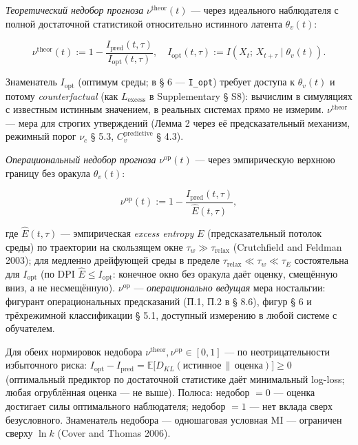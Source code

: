 \documentclass[pdflatex,sn-mathphys-ay]{sn-jnl}
\begin{document}
\emph{Теоретический недобор прогноза} \(\nu^{\text{theor}}(t)\) --- через идеального наблюдателя с полной достаточной статистикой относительно истинного латента \(\theta_v(t)\):



\begin{equation}\nu^{\text{theor}}(t) := 1 - \frac{I_{\text{pred}}(t, \tau)}{I_{\text{opt}}(t, \tau)}, \quad I_{\text{opt}}(t,\tau) := I\!\left(X_t;\, X_{t+\tau} \mid \theta_v(t)\right). \tag{7}\end{equation}



Знаменатель \(I_{\text{opt}}\) (оптимум среды; в § 6 --- \texttt{I\_opt}) требует доступа к \(\theta_v(t)\) и потому \emph{counterfactual} (как \(L_{\text{excess}}\) в Supplementary § S8): вычислим в симуляциях с известным истинным значением, в реальных системах прямо не измерим. \(\nu^{\text{theor}}\) --- мера для строгих утверждений (Лемма 2 через её предсказательный механизм, режимный порог \(\nu_c\) § 5.3, \(C_v^{\text{predictive}}\) § 4.3).



\emph{Операциональный недобор прогноза} \(\nu^{\text{op}}(t)\) --- через эмпирическую верхнюю границу без оракула \(\theta_v(t)\):



\begin{equation}\nu^{\text{op}}(t) := 1 - \frac{I_{\text{pred}}(t, \tau)}{\hat E(t, \tau)}, \tag{7'}\end{equation}



где \(\hat E(t, \tau)\) --- эмпирическая \emph{excess entropy} \(E\) (предсказательный потолок среды) по траектории на скользящем окне \(\tau_w \gg \tau_{\text{relax}}\) (Crutchfield and Feldman 2003); для медленно дрейфующей среды в пределе \(\tau_{\text{relax}} \ll \tau_w \ll \tau_E\) состоятельна для \(I_{\text{opt}}\) (по DPI \(\hat E \le I_{\text{opt}}\): конечное окно без оракула даёт оценку, смещённую вниз, а не несмещённую). \(\nu^{\text{op}}\) --- \emph{операционально ведущая} мера ностальгии: фигурант операциональных предсказаний (П.1, П.2 в § 8.6), фигур § 6 и трёхрежимной классификации § 5.1, доступный измерению в любой системе с обучателем.



Для обеих нормировок недобора \(\nu^{\text{theor}}, \nu^{\text{op}} \in [0, 1]\) --- по неотрицательности избыточного риска: \(I_{\text{opt}} - I_{\text{pred}} = \mathbb{E}\bigl[D_{KL}(\text{истинное} \,\|\, \text{оценка})\bigr] \ge 0\) (оптимальный предиктор по достаточной статистике даёт минимальный log-loss; любая огрублённая оценка --- не выше). Полюса: недобор \(= 0\) --- оценка достигает силы оптимального наблюдателя; недобор \(= 1\) --- нет вклада сверх безусловного. Знаменатель недобора --- одношаговая условная MI --- ограничен сверху \(\ln k\) (Cover and Thomas 2006).
\end{document}
